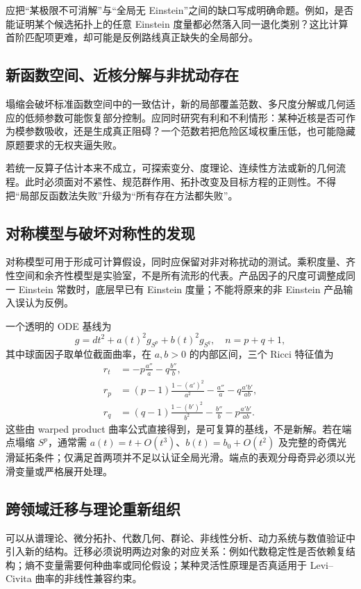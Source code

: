 \documentclass[11pt,a4paper]{article}
\theoremstyle{definition}
\begin{document}
应把“某极限不可消解”与“全局无 Einstein”之间的缺口写成明确命题。例如，是否能证明某个候选拓扑上的任意 Einstein 度量都必然落入同一退化类别？这比计算首阶匹配项更难，却可能是反例路线真正缺失的全局部分。

\subsection{新函数空间、近核分解与非扰动存在}

塌缩会破坏标准函数空间中的一致估计，新的局部覆盖范数、多尺度分解或几何适应的低频参数可能恢复部分控制。应同时研究有利和不利情形：某种近核是否可作为模参数吸收，还是生成真正阻碍？一个范数若把危险区域权重压低，也可能隐藏原题要求的无权夹逼失败。

若统一反算子估计本来不成立，可探索变分、度理论、连续性方法或新的几何流程。此时必须面对不紧性、规范群作用、拓扑改变及目标方程的正则性。不得把“局部反函数法失败”升级为“所有存在方法都失败”。

\subsection{对称模型与破坏对称性的发现}

对称模型可用于形成可计算假设，同时应保留对非对称扰动的测试。乘积度量、齐性空间和余齐性模型是实验室，不是所有流形的代表。产品因子的尺度可调整成同一 Einstein 常数时，底层早已有 Einstein 度量；不能将原来的非 Einstein 产品输入误认为反例。

一个透明的 ODE 基线为
\[
g=dt^2+a(t)^2g_{S^p}+b(t)^2g_{S^q},\quad n=p+q+1,
\]
其中球面因子取单位截面曲率，在 $a,b>0$ 的内部区间，三个 Ricci 特征值为
\begin{align*}
r_t&=-p\frac{a''}{a}-q\frac{b''}{b},\\
r_p&=(p-1)\frac{1-(a')^2}{a^2}-\frac{a''}{a}
-q\frac{a'b'}{ab},\\
r_q&=(q-1)\frac{1-(b')^2}{b^2}-\frac{b''}{b}
-p\frac{a'b'}{ab}.
\end{align*}
这些由 warped product 曲率公式直接得到，是可复算的基线，不是新解。若在端点塌缩 $S^p$，通常需 $a(t)=t+O(t^3)$、$b(t)=b_0+O(t^2)$ 及完整的奇偶光滑延拓条件；仅满足首两项并不足以认证全局光滑。端点的表观分母奇异必须以光滑变量或严格展开处理。

\subsection{跨领域迁移与理论重新组织}

可以从谱理论、微分拓扑、代数几何、群论、非线性分析、动力系统与数值验证中引入新的结构。迁移必须说明两边对象的对应关系：例如代数稳定性是否依赖复结构；熵不变量需要何种曲率或同伦假设；某种灵活性原理是否真适用于 Levi--Civita 曲率的非线性兼容约束。
\end{document}
